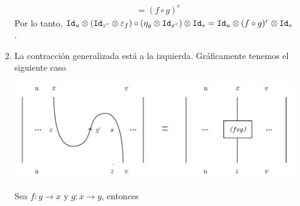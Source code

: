 \documentclass[../main.tex]{subfiles}
\begin{document}
\begin{enumerate}
\begin{enumerate}
\begin{align*}
                    &= (f \circ g)^r
                \end{align*}
                Por lo tanto, $\texttt{Id}_u \otimes (\texttt{Id}_{z^r}\otimes \varepsilon_f) \circ (\eta_g \otimes \texttt{Id}_{x^r}) \otimes \texttt{Id}_v = \texttt{Id}_u \otimes (f \circ g)^r \otimes \texttt{Id}_v $. \\
                \item La contracción generalizada está a la izquierda. Gráficamente tenemos el siguiente caso
                \begin{center} \includegraphics[scale=.2]{TeX/diagrama/5-9.pdf}
                \end{center}
                Sea $f:y \to x$ y $g:x \to y$, entonces


\end{enumerate}
\end{enumerate}
\end{document}
